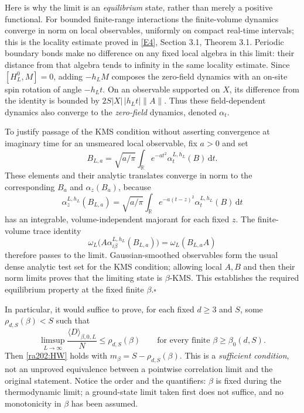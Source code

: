 \documentclass[11pt]{article}
\newcommand{\R}{\mathbb{R}}
\newcommand{\dd}{\,\mathrm d}
\newcommand{\eref}[2]{\hyperlink{extra:#1:#2}{[E#2]}}
\begin{document}
	Here is why the limit is an \emph{equilibrium} state, rather than merely
	a positive functional. For bounded finite-range interactions the
	finite-volume dynamics converge in norm on local observables, uniformly
	on compact real-time intervals; this is the locality estimate proved in
	\eref{202}{4}, Section 3.1, Theorem 3.1. Periodic boundary bonds make no
	difference on any fixed local algebra in this limit: their distance
	from that algebra tends to infinity in the same locality estimate.
	Since $[H_L^0,M]=0$, adding $-h_LM$ composes the zero-field dynamics
	with an on-site spin rotation of angle $-h_Lt$. On an observable
	supported on $X$, its difference from the identity is bounded by
	$2S|X|\,|h_Lt|\|A\|$. Thus these field-dependent dynamics also converge
	to the \emph{zero-field} dynamics, denoted $\alpha_t$.
	
	To justify passage of the KMS condition without asserting convergence
	at imaginary time for an unsmeared local observable, fix $a>0$ and set
	\[
	B_{L,a}=\sqrt{a/\pi}\int_{\R} e^{-at^2}\alpha_t^{L,h_L}(B)\dd t.
	\]
	These elements and their analytic translates converge in norm to the
	corresponding $B_a$ and $\alpha_z(B_a)$, because
	\[
	\alpha_z^{L,h_L}(B_{L,a})
	=\sqrt{a/\pi}\int_{\R} e^{-a(t-z)^2}\alpha_t^{L,h_L}(B)\dd t
	\]
	has an integrable, volume-independent majorant for each fixed $z$.
	The finite-volume trace identity
	\[
	\omega_L\bigl(A\alpha_{i\beta}^{L,h_L}(B_{L,a})\bigr)
	=\omega_L(B_{L,a}A)
	\]
	therefore passes to the limit. Gaussian-smoothed observables form the
	usual dense analytic test set for the KMS condition; allowing local
	$A,B$ and then their norm limits proves that the limiting state is
	$\beta$-KMS. This establishes the required equilibrium property at the
	fixed finite $\beta$.\hfill$\square$
	
	In particular, it would suffice to prove, for each fixed $d\geq3$ and
	$S$, some $\rho_{d,S}(\beta)<S$ such that
	\begin{equation}\label{ra202:defectgoal}
		\limsup_{L\to\infty}\frac{\langle D\rangle_{\beta,0,L}}{N}
		\leq\rho_{d,S}(\beta)
		\qquad\text{for every finite }\beta\geq\beta_0(d,S).
	\end{equation}
	Then \eqref{ra202:HW} holds with $m_\beta=S-\rho_{d,S}(\beta)$.
	This is a \emph{sufficient condition}, not an unproved equivalence
	between a pointwise correlation limit and the original statement.
	Notice the order and the quantifiers: $\beta$ is fixed during the
	thermodynamic limit; a ground-state limit taken first does not suffice,
	and no monotonicity in $\beta$ has been assumed.
	
\end{document}
